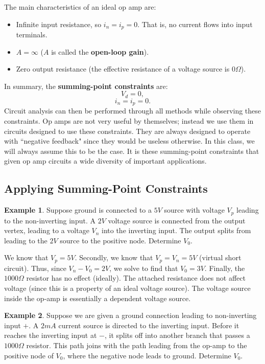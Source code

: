 \documentclass[11pt]{article}
\theoremstyle{plain} %
\theoremstyle{definition}
\theoremstyle{example}
\newtheorem*{example}{Example}
\theoremstyle{remark}
\begin{document}
The main characteristics of an ideal op amp are:
\begin{itemize}
	\item Infinite input resistance, so $i_n = i_p = 0$. That is, no current flows into input terminals.
	\item $A = \infty$ ($A$ is called the \textbf{open-loop gain}).
	\item Zero output resistance (the effective resistance of a voltage source is $0\Omega$). 
\end{itemize}

In summary, the \textbf{summing-point constraints} are:
$$V_d = 0,$$
$$i_n=i_p=0.$$
Circuit analysis can then be performed through all methods while observing these constraints. Op amps are not very useful by themselves; instead we use them in circuits designed to use these constraints. They are always designed to operate with ``negative feedback" since they would be useless otherwise. In this class, we will always assume this to be the case. It is these summing-point constraints that given op amp circuits a wide diversity of important applications. 

\subsection{Applying Summing-Point Constraints}

\begin{example}
Suppose ground is connected to a $5V$ source with voltage $V_p$ leading to the non-inverting input. A $2V$ voltage source is connected from the output vertex, leading to a voltage $V_n$ into the inverting input. The output splits from leading to the $2V$ source to the positive node. Determine $V_0$.
\end{example}

We know that $V_p = 5V$. Secondly, we know that $V_p = V_n = 5V$ (virtual short circuit). Thus, since $V_n - V_0 = 2V$, we solve to find that $V_0 = 3V$. Finally, the $1000\Omega$ resistor has no effect (ideally). The attached resistance does not affect voltage (since this is a property of an ideal voltage source).  
The voltage source inside the op-amp is essentially a dependent voltage source. 

\begin{example}
Suppose we are given a ground connection leading to non-inverting input $+$. A $2mA$ current source is directed to the inverting input. Before it reaches the inverting input at $-$, it splits off into another branch that passes a $1000\Omega$ resistor. This path joins with the path leading from the op-amp to the positive node of $V_0$, where the negative node leads to ground. Determine $V_0$.\end{example}
\end{document}
